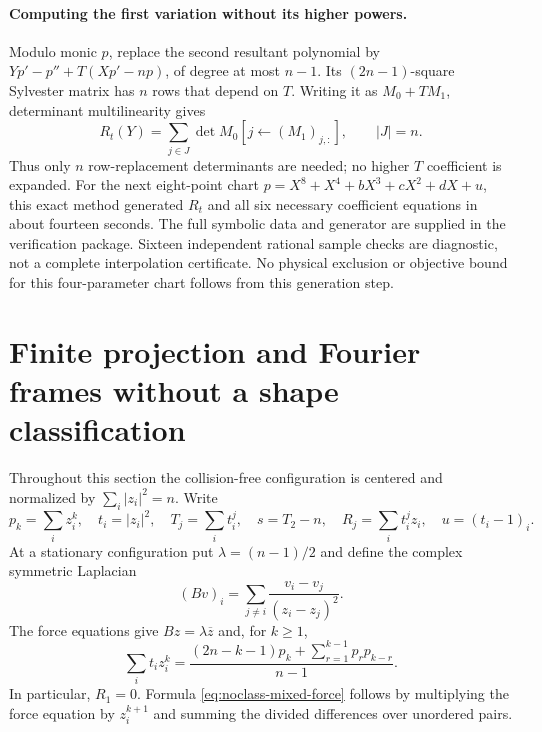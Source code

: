 \documentclass[11pt]{article}
\theoremstyle{remark}
\numberwithin{equation}{section}
\begin{document}
\paragraph{Computing the first variation without its higher powers.}
Modulo monic $p$, replace the second resultant polynomial by
$Yp'-p''+T(Xp'-np)$, of degree at most $n-1$.
Its $(2n-1)$-square Sylvester matrix has $n$ rows that depend on $T$.
Writing it as $M_0+TM_1$, determinant multilinearity gives
\[
 R_t(Y)=\sum_{j\in J}\det M_0[j\leftarrow(M_1)_{j,:}],
 \qquad |J|=n.
\]
Thus only $n$ row-replacement determinants are needed; no higher
$T$ coefficient is expanded. For the next eight-point chart
$p=X^8+X^4+bX^3+cX^2+dX+u$, this exact method generated $R_t$
and all six necessary coefficient equations in about fourteen seconds.
The full symbolic data and generator are supplied in the verification
package. Sixteen independent rational sample checks are diagnostic,
not a complete interpolation certificate. No physical exclusion or
objective bound for this four-parameter chart follows from this
generation step.

\section{Finite projection and Fourier frames without a shape classification}
\label{sec:noclass-frames}

Throughout this section the collision-free configuration is centered
and normalized by $\sum_i|z_i|^2=n$. Write
\[
 p_k=\sum_i z_i^k,\quad t_i=|z_i|^2,\quad
 T_j=\sum_i t_i^j,\quad s=T_2-n,\quad
 R_j=\sum_i t_i^jz_i,\quad u=(t_i-1)_i .
\]
At a stationary configuration put $\lambda=(n-1)/2$ and define the
complex symmetric Laplacian
\[
 (Bv)_i=\sum_{j\ne i}\frac{v_i-v_j}{(z_i-z_j)^2}.
\]
The force equations give $Bz=\lambda\overline z$ and, for $k\ge1$,
\begin{equation}\label{eq:noclass-mixed-force}
 \sum_i t_i z_i^k
 =\frac{(2n-k-1)p_k+\sum_{r=1}^{k-1}p_rp_{k-r}}{n-1}.
\end{equation}
In particular, $R_1=0$. Formula \eqref{eq:noclass-mixed-force}
follows by multiplying the force equation by $z_i^{k+1}$ and
summing the divided differences over unordered pairs.
\end{document}
